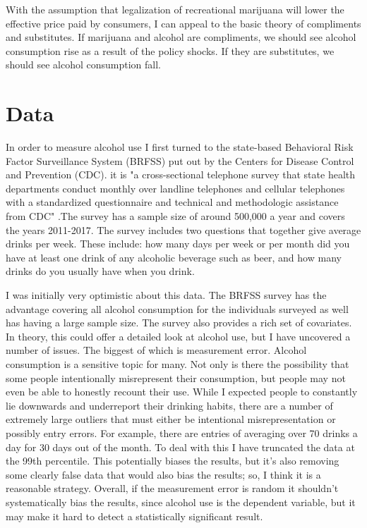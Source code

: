 \documentclass[11pt]{article}
\begin{document}
With the assumption that legalization of recreational marijuana will lower the effective price paid by consumers, I can appeal to the basic theory of compliments and substitutes. If marijuana and alcohol are compliments, we should see alcohol consumption rise as a result of the policy shocks. If they are substitutes, we should see alcohol consumption fall.\par





\section{Data}

In order to measure alcohol use I first turned to the state-based Behavioral Risk Factor Surveillance System (BRFSS) put out by the Centers for Disease Control and Prevention (CDC). it is "a cross-sectional telephone survey that state health departments conduct monthly over landline telephones and cellular telephones with a standardized questionnaire and technical and methodologic assistance from CDC" \cite{BRFSS_homepage}.The survey has a sample size of around 500,000 a year and covers the years 2011-2017. The survey includes two questions that together give average drinks per week. These include: how many days per week or per month did you have at least one drink of any alcoholic beverage such as beer, and how many drinks do you usually have when you drink. \par


I was initially very optimistic about this data. The BRFSS survey has the advantage covering all alcohol consumption for the individuals surveyed as well has having a large sample size. The survey also provides a rich set of covariates. In theory, this could offer a detailed look at alcohol use, but I have uncovered a number of issues. The biggest of which is measurement error. Alcohol consumption is a sensitive topic for many. Not only is there the possibility that some people intentionally misrepresent their consumption, but people may not even be able to honestly recount their use. While I expected people to constantly lie downwards and underreport their drinking habits, there are a number of extremely large outliers that must either be intentional misrepresentation or possibly entry errors. For example, there are entries of averaging over 70 drinks a day for 30 days out of the month. To deal with this I have truncated the data at the 99th percentile. This potentially biases the results, but it's also removing some clearly false data that would also bias the results; so, I think it is a reasonable strategy. Overall, if the measurement error is random it shouldn't systematically bias the results, since alcohol use is the dependent variable, but it may make it hard to detect a statistically significant result. \par
\end{document}
